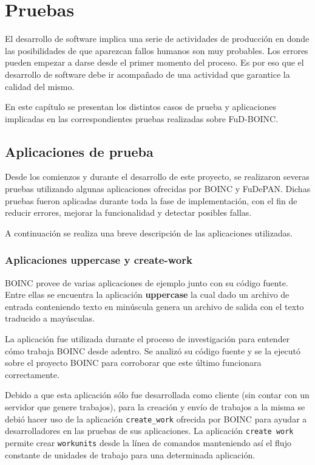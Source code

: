 \chapter{Pruebas}
\label{chapter:pruebas}

El desarrollo de software implica una serie de actividades de producción en donde las posibilidades de que aparezcan fallos humanos son muy probables. Los errores pueden empezar a darse desde el primer momento del proceso. Es por eso que el desarrollo de software debe ir acompañado de una actividad que garantice la calidad del mismo.

En este capítulo se presentan los distintos casos de prueba y aplicaciones implicadas en las correspondientes pruebas realizadas sobre FuD-BOINC.

\section{Aplicaciones de prueba}

Desde los comienzos y durante el desarrollo de este proyecto, se realizaron severas pruebas utilizando algunas aplicaciones ofrecidas por BOINC y FuDePAN. Dichas pruebas fueron aplicadas durante toda la fase de implementación, con el fin de reducir errores, mejorar la funcionalidad y detectar posibles fallas.

A continuación se realiza una breve descripción de las aplicaciones utilizadas.

\subsection{Aplicaciones uppercase y create-work}

BOINC provee de varias aplicaciones de ejemplo junto con su código fuente. Entre ellas se encuentra la aplicación \textbf{uppercase} la cual dado un archivo de entrada conteniendo texto en minúscula genera un archivo de salida con el texto traducido a mayúsculas. 

La aplicación fue utilizada durante el proceso de investigación para entender cómo trabaja BOINC desde adentro. Se analizó 
su código fuente y se la ejecutó sobre el proyecto BOINC para corroborar que este último funcionara correctamente.

Debido a que esta aplicación sólo fue desarrollada como cliente (sin contar con un servidor que genere trabajos), para la creación y envío de trabajos a la misma se debió hacer uso de la aplicación \texttt{create\_work} ofrecida por BOINC para ayudar a desarrolladores en las pruebas de sus aplicaciones. La aplicación \texttt{create work} permite crear \texttt{workunits} desde la línea de comandos manteniendo así el flujo constante de unidades de trabajo para una determinada aplicación.

